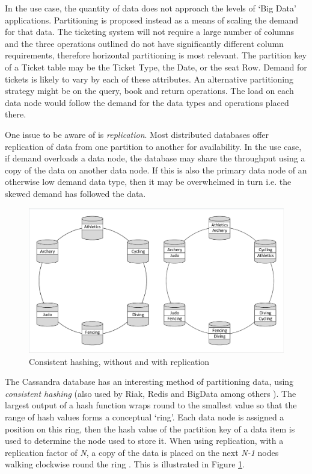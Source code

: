 \documentclass[runningheads]{llncs}
\begin{document}
In the use case, the quantity of data does not approach the levels of `Big Data' applications.  Partitioning is proposed instead as a means of scaling the demand for that data.  The ticketing system will not require a large number of columns and the three operations outlined do not have significantly different column requirements, therefore horizontal partitioning is most relevant.  The partition key of a Ticket table may be the Ticket Type, the Date, or the seat Row.  Demand for tickets is likely to vary by each of these attributes.  An alternative partitioning strategy might be on the query, book and return operations.  The load on each data node would follow the demand for the data types and operations placed there.

One issue to be aware of is {\itshape replication}.   Most distributed databases offer replication of data from one partition to another for availability.  In the use case, if demand overloads a data node, the database may share the throughput using a copy of the data on another data node.  If this is also the primary data node of an otherwise low demand data type, then it may be overwhelmed in turn i.e. the skewed demand has followed the data.

\begin{figure}
	\centering
	\includegraphics[trim = 5 5 5 5, clip, width=\textwidth]{img/dbdist}
	\caption{Consistent hashing, without and with replication}
	\label{figure:consistent_hashing}
\end{figure}
\FloatBarrier
The Cassandra database has an interesting method of partitioning data, using {\itshape consistent hashing} (also used by Riak, Redis and BigData among others \cite{RN66}).  The largest output of a hash function wraps round to the smallest value so that the range of hash values forms a conceptual `ring'.  Each data node is assigned a position on this ring, then the hash value of the partition key of a data item is used to determine the node used to store it.  When using replication, with a replication factor of {\itshape N}, a copy of the data is placed on the next {\itshape N-1} nodes walking clockwise round the ring \cite{RN1050}.  This is illustrated in Figure \ref{figure:consistent_hashing}.
\end{document}
